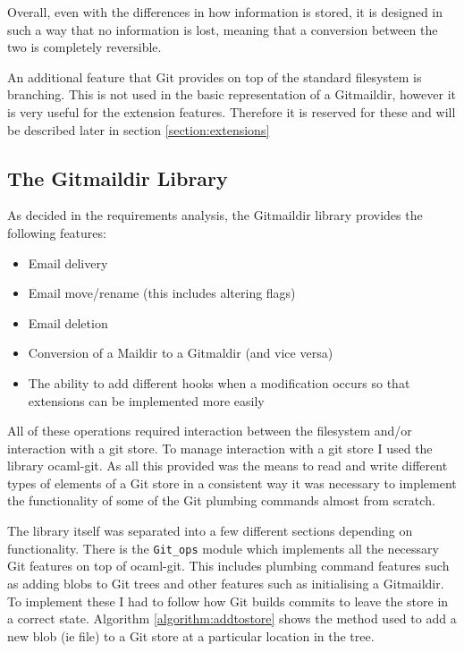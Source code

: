 Overall, even with the differences in how information is stored, it is designed in such a way that no information is lost, meaning that a conversion between the two is completely reversible.

An additional feature that Git provides on top of the standard filesystem is branching. This is not used in the basic representation of a Gitmaildir, however it is very useful for the extension features. Therefore it is reserved for these and will be described later in section \ref{section:extensions}

\subsection{The Gitmaildir Library}

As decided in the requirements analysis, the Gitmaildir library provides the following features:

\begin{itemize}
\item Email delivery
\item Email move/rename (this includes altering flags)
\item Email deletion
\item Conversion of a Maildir to a Gitmaldir (and vice versa)
\item The ability to add different hooks when a modification occurs so that extensions can be implemented more easily
\end{itemize}

All of these operations required interaction between the filesystem and/or interaction with a git store. To manage interaction with a git store I used the library ocaml-git. As all this provided was the means to read and write different types of elements of a Git store in a consistent way it was necessary to implement the functionality of some of the Git plumbing commands almost from scratch.

The library itself was separated into a few different sections depending on functionality. There is the \texttt{Git\_ops} module which implements all the necessary Git features on top of ocaml-git. This includes plumbing command features such as adding blobs to Git trees and other features such as initialising a Gitmaildir. To implement these I had to follow how Git builds commits to leave the store in a correct state. Algorithm \ref{algorithm:addtostore} shows the method used to add a new blob (ie file) to a Git store at a particular location in the tree.

